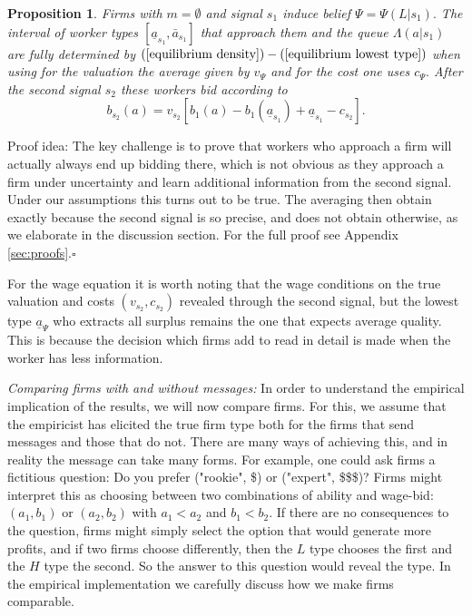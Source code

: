 \documentclass[12pt]{article}
\theoremstyle{plain}
\newtheorem{prop}{Proposition}
\begin{document}
\begin{prop}
\label{equilibrium-notalk}Firms with $m=\emptyset $ and signal $s_{1}$
induce belief $\Psi =\Psi (L|s_{1}).$ The interval of worker types $[%
\underline{a}_{s_{1}},\bar{a}_{s_{1}}]$ that approach them and the queue $%
\Lambda (a|s_{1})$ are fully determined by $(\ref{equilibrium density})-(\ref%
{equilibrium lowest type})$ when using for the valuation the average given
by $v_{\Psi }$ and for the cost one uses $c_{\Psi }.$ After the second
signal $s_{2}$ these workers bid according to%
\begin{equation}
b_{s_{2}}(a)=v_{s_{2}}[b_{1}(a)-b_{1}(\underline{a}_{s_{1}})+\underline{a}%
_{s_{1}}-c_{s_{2}}].  \label{wages-general}
\end{equation}
\end{prop}

Proof idea: The key challenge is to prove that workers who approach a firm
will actually always end up bidding there, which is not obvious as they
approach a firm under uncertainty and learn additional information from the
second signal. Under our assumptions this turns out to be true. The
averaging then obtain exactly because the second signal is so precise, and
does not obtain otherwise, as we elaborate in the discussion section. For
the full proof see Appendix \ref{sec:proofs}.$\square $\bigskip

For the wage equation it is worth noting that the wage conditions on the
true valuation and costs $(v_{s_{2}},c_{s_{2}})$ revealed through the second
signal, but the lowest type $\underline{a}_{\Psi }$ who extracts all surplus
remains the one that expects average quality. This is because the decision
which firms add to read in detail is made when the worker has less
information.

\bigskip

\textit{Comparing firms with and without messages:} In order to understand
the empirical implication of the results, we will now compare firms. For
this, we assume that the empiricist has elicited the true firm type both for
the firms that send messages and those that do not. There are many ways of
achieving this, and in reality the message can take many forms. For example,
one could ask firms a fictitious question: Do you prefer ("rookie", \$) or
("expert", \$\$\$)? Firms might interpret this as choosing between two
combinations of ability and wage-bid: $(a_{1},b_{1})$ or $(a_{2},b_{2})$
with $a_{1}<a_{2}$ and $b_{1}<b_{2}.$ If there are no consequences to the
question, firms might simply select the option that would generate more
profits, and if two firms choose differently, then the $L$ type chooses the
first and the $H$ type the second. So the answer to this question would
reveal the type. In the empirical implementation we carefully discuss how we
make firms comparable.
\end{document}

